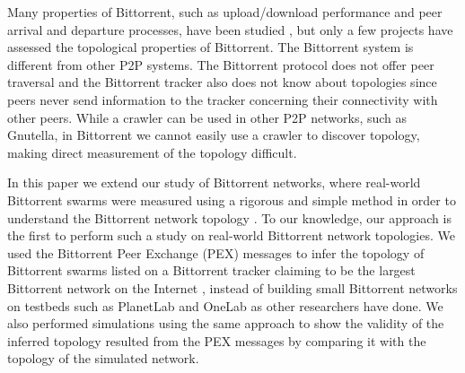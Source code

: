 \documentclass[paper]{ieice}
\begin{document}
Many properties of Bittorrent, such as upload/download performance and peer arrival and departure processes, have been studied \cite{guo2005measurements}, but only a few projects have assessed the topological properties of Bittorrent.
The Bittorrent system is different from other P2P systems.
The Bittorrent protocol does not offer peer traversal and the Bittorrent tracker also does not know about topologies since peers never send information to the tracker concerning their connectivity with other peers. 
While a crawler can be used in other P2P networks, such as Gnutella, in Bittorrent we cannot easily use a crawler to discover topology, making direct measurement of the topology difficult.

In this paper we extend our study of Bittorrent networks, where real-world Bittorrent swarms were measured using a rigorous and simple method in order to understand the Bittorrent network topology \cite{Fauzie2011}. 
To our knowledge, our approach is the first to perform such a study on real-world Bittorrent network topologies. 
We used the Bittorrent Peer Exchange (PEX) messages to infer the topology of Bittorrent swarms listed on a Bittorrent tracker claiming to be the largest Bittorrent network on the Internet  \cite{piratebay}\cite{zhang2010unraveling}, instead of building small Bittorrent networks on testbeds such as PlanetLab and OneLab as other researchers have done. 
We also performed simulations using the same approach to show the validity of the inferred topology  resulted from the PEX messages by comparing it with the topology of the simulated network.
\end{document}
